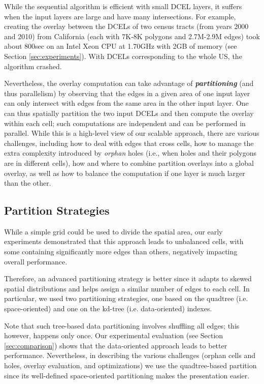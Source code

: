 While the sequential algorithm is efficient with small DCEL layers, it suffers when the input layers are large and have many intersections. For example, creating the overlay between the DCELs of two census tracts (from years 2000 and 2010) from California (each with 7K-8K polygons and 2.7M-2.9M edges) took about 800sec on an Intel Xeon CPU at 1.70GHz  with 2GB of memory (see Section \ref{sec:experiments}). With DCELs corresponding to the whole US, the algorithm crashed. 

Nevertheless, the overlay computation can take advantage of \textit{\textbf{partitioning}} (and thus parallelism) by observing that the edges in a given area of one input layer can only intersect with edges from the same area in the other input layer. One can thus spatially partition the two input DCELs 
and then compute the overlay within each cell; such computations are independent and can be performed in parallel. While this is a high-level view of our scalable approach, there are various challenges, including how to deal with edges that cross cells, how to manage the extra complexity introduced by \textit{orphan} holes (i.e., when holes and their polygons are in different cells), how and where to combine partition overlays into a global overlay, as well as how to balance the computation if one layer is much larger than the other. 

\subsection{Partition Strategies} \label{sec:pstrategies}
While a simple grid could be used to divide the spatial area, our early experiments demonstrated that this approach leads to unbalanced cells, with some containing significantly more edges than others, negatively impacting overall performance.

Therefore, an advanced partitioning strategy is better since it adapts to skewed spatial distributions and helps assign a similar number of edges to each cell. In particular, we used two partitioning strategies, one based on the quadtree (i.e. space-oriented) and one on the kd-tree (i.e. data-oriented) indexes.

Note that such tree-based data partitioning involves shuffling all edges; this however, happens only once.
Our experimental evaluation (see Section \ref{sec:comparison}) shows that the data-oriented approach leads to better performance. Nevertheless, in describing the various challenges (orphan cells and holes, overlay evaluation, and optimizations) we use the quadtree-based partition since its well-defined space-oriented partitioning makes the presentation easier.

